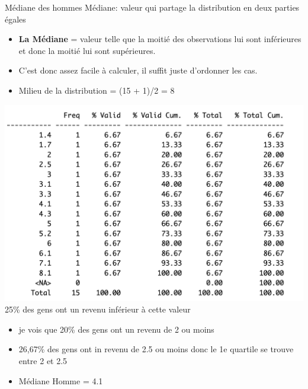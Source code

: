 \documentclass[
  ignorenonframetext,
]{beamer}
\begin{document}
\begin{frame}{Médiane des hommes}
\protect\hypertarget{muxe9diane-des-hommes}{}
Médiane: valeur qui partage la distribution en deux parties égales

\begin{itemize}
\item
  \textbf{La Médiane} = valeur telle que la moitié des observations lui
  sont inférieures et donc la moitié lui sont supérieures.
\item
  C'est donc assez facile à calculer, il suffit juste d'ordonner les
  cas.
\item
  Milieu de la distribution = (15 + 1)/2 = 8
\end{itemize}

\includegraphics{../../Images/cours4.1.png} 25\% des gens ont un revenu
inférieur à cette valeur

\begin{itemize}
\item
  je vois que 20\% des gens ont un revenu de 2 ou moins
\item
  26,67\% des gens ont in revenu de 2.5 ou moins donc le 1e quartile se
  trouve entre 2 et 2.5
\item
  Médiane Homme = 4.1
\end{itemize}
\end{frame}
\end{document}
